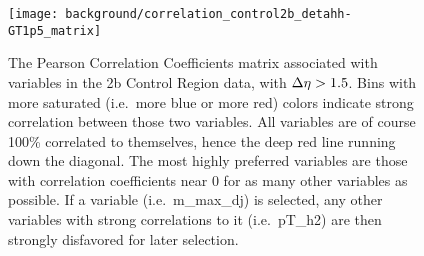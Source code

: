     \begin{figure}[tbh]
        \texttt{[image: background/correlation\_control2b\_detahh-GT1p5\_matrix]}
        \caption{
            The Pearson Correlation Coefficients matrix associated with variables in the 2b Control Region data,
                with $\Delta \eta > 1.5$.
            Bins with more saturated (i.e.\ more blue or more red) colors indicate strong correlation between those two variables.
            All variables are of course 100\% correlated to themselves, hence the deep red line running down the diagonal.
            The most highly preferred variables are those with correlation coefficients near 0 for as many other variables as possible.
            If a variable (i.e.\ m\_max\_dj) is selected, any other variables with strong correlations to it (i.e.\ pT\_h2)
                are then strongly disfavored for later selection.
        }
        \label{fig:vbf_corr_matrix_GT1.5}
    \end{figure}


